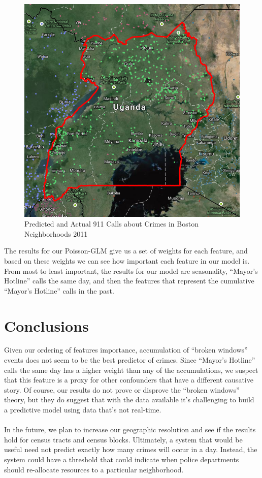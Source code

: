 \documentclass[a0,final]{a0poster}
\begin{document}
\begin{multicols}{3}
\begin{figure}[H]
\centering
\includegraphics[scale=0.75]{figs/uganda.png}
\caption{Predicted and Actual 911 Calls about Crimes in Boston Neighborhoods 2011}
\label{hoodgraph}
\end{figure}
\noindent The results for our Poisson-GLM give us a set of weights for each feature, and based on these weights we can see how important each feature in our model is. From most to least important, the results for our model are seasonality, ``Mayor's Hotline'' calls the same day, and then the features that represent the cumulative ``Mayor's Hotline'' calls in the past.

\section*{Conclusions}
Given our ordering of features importance, accumulation of ``broken windows'' events does not seem to be the best predictor of crimes. Since ``Mayor's Hotline'' calls the same day has a higher weight than any of the accumulations, we suspect that this feature is a proxy for other confounders that have a different causative story. Of course, our results do not prove or disprove the ``broken windows'' theory, but they do suggest that with the data available it's challenging to build a predictive model using data that's not real-time.\\
\\
In the future, we plan to increase our geographic resolution and see if the results hold for census tracts and census blocks. Ultimately, a system that would be useful need not predict exactly how many crimes will occur in a day. Instead, the system could have a threshold that could indicate when police departments should re-allocate resources to a particular neighborhood.


\end{multicols}
\end{document}
